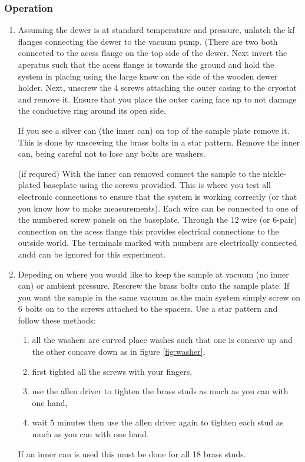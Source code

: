 \documentclass[m_cmp_sc_manual.tex]{subfiles}
\begin{document}
\subsubsection{Operation}
\begin{enumerate}
  \item Assuming the dewer is at standard temperature and pressure, unlatch the
    kf flanges connecting the dewer to the vacuum pump. (There are two both
    connected to the acess flange on the top side of the dewer. Next invert the
    aperatus such that the acess flange is towards the ground and hold the
    system in placing using the large know on the side of the wooden dewer
    holder. Next, unscrew the 4 screws attaching the outer casing to the
    cryostat and remove it. Ensure that you place the outer casing face up to
    not damage the conductive ring around its open side. 

    If you see a silver can (the inner can) on top of the sample plate remove
    it. This is done by unscewing the brass bolts in a star pattern. Remove the
    inner can, being careful not to lose any bolts are washers. 

    (if requred) With the inner can removed connect the sample to the
    nickle-plated baseplate using the screws providied. This is where you test
    all electronic connections to ensure that the system is working correctly
    (or that you know how to make measurements). Each wire can be connected to
    one of the numbered screw panels on the baseplate. Through the 12 wire (or
    6-pair) connection on the acess flange this provides electrical connections
    to the outside world. The terminals marked with numbers are electrically
    connected andd can be ignored for this experiment. 

  \item Depeding on where you would like to keep the sample at vacuum (no inner
    can) or ambient pressure. Rescrew the brass bolts onto the sample plate. If
    you want the sample in the same vacuum as the main system simply screw on 6
    bolts on to the screws attached to the spacers. Use a star pattern and
    follow these methods:
    \begin{enumerate}
      \item all the washers are curved place washes such that one is concave up
	and the other concave down as in figure \ref{fig:washer},
      \item first tighted all the screws with your fingers,
      \item use the allen driver to tighten the brass studs as much as you can with
	one hand,
      \item wait 5 minutes then use the allen driver again to tighten each stud
	as much as you can with one hand.
    \end{enumerate}
    If an inner can is used this must be done for all 18 brass studs.


\end{enumerate}
\end{document}

